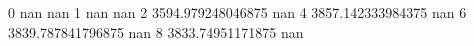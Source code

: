 0 nan nan
1 nan nan
2 3594.979248046875 nan
4 3857.142333984375 nan
6 3839.787841796875 nan
8 3833.74951171875 nan

